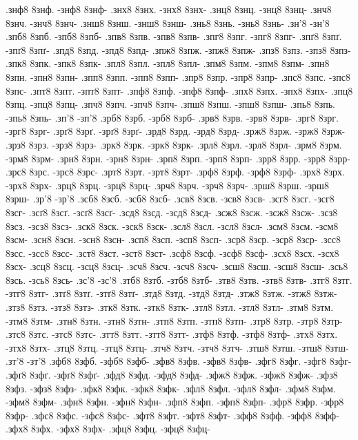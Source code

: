 {.знф8 8знф. -знф8 8знф-
.знх8 8знх. -знх8 8знх-
.знц8 8знц. -знц8 8знц-
.знч8 8знч. -знч8 8знч-
.знш8 8знш. -знш8 8знш-
.знь8 8знь. -знь8 8знь-
.зн'8 -зн'8
.зпб8 8зпб. -зпб8 8зпб-
.зпв8 8зпв. -зпв8 8зпв-
.зпг8 8зпг. -зпг8 8зпг-
.зпґ8 8зпґ. -зпґ8 8зпґ-
.зпд8 8зпд. -зпд8 8зпд-
.зпж8 8зпж. -зпж8 8зпж-
.зпз8 8зпз. -зпз8 8зпз-
.зпк8 8зпк. -зпк8 8зпк-
.зпл8 8зпл. -зпл8 8зпл-
.зпм8 8зпм. -зпм8 8зпм-
.зпн8 8зпн. -зпн8 8зпн-
.зпп8 8зпп. -зпп8 8зпп-
.зпр8 8зпр. -зпр8 8зпр-
.зпс8 8зпс. -зпс8 8зпс-
.зпт8 8зпт. -зпт8 8зпт-
.зпф8 8зпф. -зпф8 8зпф-
.зпх8 8зпх. -зпх8 8зпх-
.зпц8 8зпц. -зпц8 8зпц-
.зпч8 8зпч. -зпч8 8зпч-
.зпш8 8зпш. -зпш8 8зпш-
.зпь8 8зпь. -зпь8 8зпь-
.зп'8 -зп'8
.зрб8 8зрб. -зрб8 8зрб-
.зрв8 8зрв. -зрв8 8зрв-
.зрг8 8зрг. -зрг8 8зрг-
.зрґ8 8зрґ. -зрґ8 8зрґ-
.зрд8 8зрд. -зрд8 8зрд-
.зрж8 8зрж. -зрж8 8зрж-
.зрз8 8зрз. -зрз8 8зрз-
.зрк8 8зрк. -зрк8 8зрк-
.зрл8 8зрл. -зрл8 8зрл-
.зрм8 8зрм. -зрм8 8зрм-
.зрн8 8зрн. -зрн8 8зрн-
.зрп8 8зрп. -зрп8 8зрп-
.зрр8 8зрр. -зрр8 8зрр-
.зрс8 8зрс. -зрс8 8зрс-
.зрт8 8зрт. -зрт8 8зрт-
.зрф8 8зрф. -зрф8 8зрф-
.зрх8 8зрх. -зрх8 8зрх-
.зрц8 8зрц. -зрц8 8зрц-
.зрч8 8зрч. -зрч8 8зрч-
.зрш8 8зрш. -зрш8 8зрш-
.зр'8 -зр'8
.зсб8 8зсб. -зсб8 8зсб-
.зсв8 8зсв. -зсв8 8зсв-
.зсг8 8зсг. -зсг8 8зсг-
.зсґ8 8зсґ. -зсґ8 8зсґ-
.зсд8 8зсд. -зсд8 8зсд-
.зсж8 8зсж. -зсж8 8зсж-
.зсз8 8зсз. -зсз8 8зсз-
.зск8 8зск. -зск8 8зск-
.зсл8 8зсл. -зсл8 8зсл-
.зсм8 8зсм. -зсм8 8зсм-
.зсн8 8зсн. -зсн8 8зсн-
.зсп8 8зсп. -зсп8 8зсп-
.зср8 8зср. -зср8 8зср-
.зсс8 8зсс. -зсс8 8зсс-
.зст8 8зст. -зст8 8зст-
.зсф8 8зсф. -зсф8 8зсф-
.зсх8 8зсх. -зсх8 8зсх-
.зсц8 8зсц. -зсц8 8зсц-
.зсч8 8зсч. -зсч8 8зсч-
.зсш8 8зсш. -зсш8 8зсш-
.зсь8 8зсь. -зсь8 8зсь-
.зс'8 -зс'8
.зтб8 8зтб. -зтб8 8зтб-
.зтв8 8зтв. -зтв8 8зтв-
.зтг8 8зтг. -зтг8 8зтг-
.зтґ8 8зтґ. -зтґ8 8зтґ-
.зтд8 8зтд. -зтд8 8зтд-
.зтж8 8зтж. -зтж8 8зтж-
.зтз8 8зтз. -зтз8 8зтз-
.зтк8 8зтк. -зтк8 8зтк-
.зтл8 8зтл. -зтл8 8зтл-
.зтм8 8зтм. -зтм8 8зтм-
.зтн8 8зтн. -зтн8 8зтн-
.зтп8 8зтп. -зтп8 8зтп-
.зтр8 8зтр. -зтр8 8зтр-
.зтс8 8зтс. -зтс8 8зтс-
.зтт8 8зтт. -зтт8 8зтт-
.зтф8 8зтф. -зтф8 8зтф-
.зтх8 8зтх. -зтх8 8зтх-
.зтц8 8зтц. -зтц8 8зтц-
.зтч8 8зтч. -зтч8 8зтч-
.зтш8 8зтш. -зтш8 8зтш-
.зт'8 -зт'8
.зфб8 8зфб. -зфб8 8зфб-
.зфв8 8зфв. -зфв8 8зфв-
.зфг8 8зфг. -зфг8 8зфг-
.зфґ8 8зфґ. -зфґ8 8зфґ-
.зфд8 8зфд. -зфд8 8зфд-
.зфж8 8зфж. -зфж8 8зфж-
.зфз8 8зфз. -зфз8 8зфз-
.зфк8 8зфк. -зфк8 8зфк-
.зфл8 8зфл. -зфл8 8зфл-
.зфм8 8зфм. -зфм8 8зфм-
.зфн8 8зфн. -зфн8 8зфн-
.зфп8 8зфп. -зфп8 8зфп-
.зфр8 8зфр. -зфр8 8зфр-
.зфс8 8зфс. -зфс8 8зфс-
.зфт8 8зфт. -зфт8 8зфт-
.зфф8 8зфф. -зфф8 8зфф-
.зфх8 8зфх. -зфх8 8зфх-
.зфц8 8зфц. -зфц8 8зфц-
}
